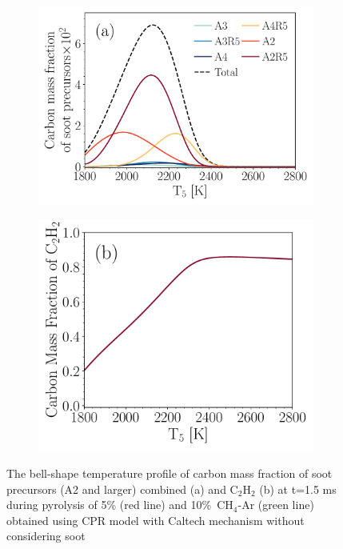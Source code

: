 \begin{figure}[H]
	\centering
	\begin{subfigure}[t]{0.4\textwidth}
		\includegraphics[width=1\textwidth]{Figures/Results/Shocktube/Agafonov2016_cpr/SPC_cmf_separate.pdf}
	\end{subfigure}
	\begin{subfigure}[t]{0.36\textwidth}
		\includegraphics[width=1\textwidth]{Figures/Results/Shocktube/Agafonov2016_cpr/C2H2_cmf.pdf}
	\end{subfigure}
	\caption{The bell-shape temperature profile of carbon mass fraction of soot precursors (A2 and larger) combined (a) and $\mathrm{C_2H_2}$ (b) at t=1.5 ms during pyrolysis of 5\% (red line) and 10\%~$\mathrm{CH_4}$-Ar (green line) obtained using CPR model with Caltech mechanism without considering soot}
	\label{fig:SPC_cmf_cpr} 
\end{figure}

